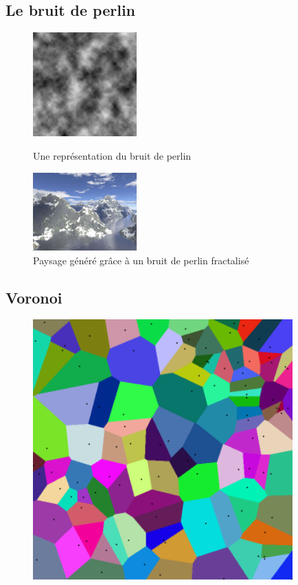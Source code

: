 \documentclass{beamer}
\begin{document}
\subsection{Le bruit de perlin}
\begin{frame}
	\begin{center}
	 \begin{figure}
	  \includegraphics[width=4cm]{Images/Images_Alexis/perlin_noise.png}
	  \caption{Une représentation du bruit de perlin}
	  \includegraphics[width=4cm]{Images/Images_Alexis/fractal&shader.jpg}
	  \caption{Paysage généré grâce à un bruit de perlin fractalisé}
	 \end{figure}
	\end{center}
\end{frame}

\subsection{Voronoi}
\begin{frame}
 \begin{center}
  \begin{figure}
   \includegraphics[width=10cm]{Images/Images_Alexis/voronoi.png}
  \end{figure}

 \end{center}

\end{frame}
\end{document}
